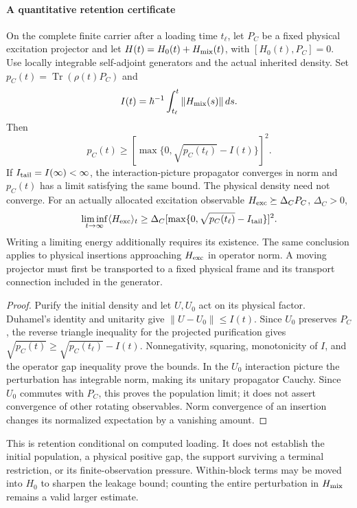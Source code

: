 \documentclass[12pt,a4paper]{article}
\begin{document}
\paragraph{A quantitative retention certificate}
\begin{theorem}
\label{p4:thm:v2209-controlled-excitation-survival}
On the complete finite carrier after a loading time \(t_\ell\), let
\(P_C\) be a fixed physical excitation projector and let
\(H(t)=H_0(t)+H_{\rm mix}(t)\), with \([H_0(t),P_C]=0\).
Use locally integrable self-adjoint generators and the actual inherited
density. Set \(p_C(t)=\operatorname{Tr}(\rho(t)P_C)\) and
\[
 I(t)=\hbar^{-1}\int_{t_\ell}^t\|H_{\rm mix}(s)\|\,ds.
\]
Then
\begin{equation}
\label{p4:eq:v2209-survival-bound}
 p_C(t)\ge\left[\max\{0,\sqrt{p_C(t_\ell)}-I(t)\}\right]^2.
\end{equation}
If \(I_{\rm tail}=I(\infty)<\infty\), the interaction-picture propagator
converges in norm and \(p_C(t)\) has a limit satisfying the same bound.
The physical density need not converge. For an actually allocated excitation
observable \(H_{\rm exc}\succeq\Delta_CP_C\), \(\Delta_C>0\),
\[
 \liminf_{t\to\infty}\langle H_{\rm exc}\rangle_t
 \ge\Delta_C[\max\{0,\sqrt{p_C(t_\ell)}-I_{\rm tail}\}]^2.
\]
Writing a limiting energy additionally requires its existence. The same
conclusion applies to physical insertions approaching \(H_{\rm exc}\)
in operator norm. A moving projector must first be transported to a fixed
physical frame and its transport connection included in the generator.
\end{theorem}
\begin{proof}
Purify the initial density and let \(U,U_0\) act on its physical factor.
Duhamel's identity and unitarity give \(\|U-U_0\|\le I(t)\).
Since \(U_0\) preserves \(P_C\), the reverse triangle inequality for
the projected purification gives
\(\sqrt{p_C(t)}\ge\sqrt{p_C(t_\ell)}-I(t)\).
Nonnegativity, squaring, monotonicity of \(I\), and the operator gap
inequality prove the bounds. In the \(U_0\) interaction picture the
perturbation has integrable norm, making its unitary propagator Cauchy.
Since \(U_0\) commutes with \(P_C\), this proves the population limit;
it does not assert convergence of other rotating observables.
Norm convergence of an insertion changes
its normalized expectation by a vanishing amount.
\end{proof}
This is retention conditional on computed loading. It does not establish
the initial population, a physical positive gap, the support surviving a
terminal restriction, or its finite-observation pressure. Within-block
terms may be moved into \(H_0\) to sharpen the leakage bound; counting the
entire perturbation in \(H_{\rm mix}\) remains a valid larger estimate.
\end{document}

